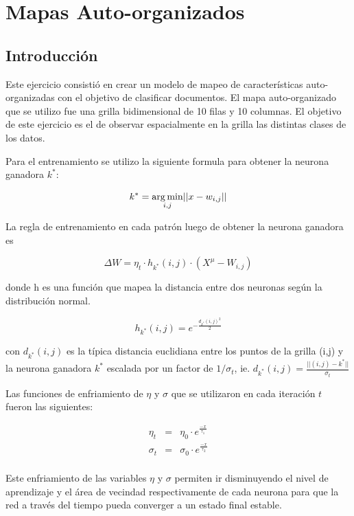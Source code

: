 \section{Mapas Auto-organizados }

\subsection{Introducción}
Este ejercicio consistió en crear un modelo de mapeo de características
auto-organizadas con el objetivo de clasificar documentos. El mapa
auto-organizado que se utilizo fue una grilla bidimensional de 10 filas y 10
columnas. El objetivo de este ejercicio es el de observar espacialmente en la
grilla las distintas clases de los datos.

Para el entrenamiento se utilizo la siguiente formula para obtener la neurona
ganadora $k^*$:

  \[
  k^* = \operatorname*{arg\,min}_{i,j} \lvert\lvert x-w_{i,j} \rvert\rvert
  \]

La regla de entrenamiento en cada patrón luego de obtener la neurona ganadora
es

\begin{equation}
	\Delta W = \eta_t \cdot h_{k^*}(i,j) \cdot (X^{\mu}-W_{i,j})
\end{equation}

donde h es una función que mapea la distancia entre dos neuronas según la
distribución normal.

\[
	h_{k^*}(i, j) = e^{-\frac{d_{k^*}(i,j)^2}{2}}
\]

con $d_{k^*}(i,j)$ es la típica distancia euclidiana entre los puntos de la
grilla (i,j) y la neurona ganadora $k^*$ escalada por un factor de
$1/\sigma_t$, ie.  $ d_{k^*}(i,j) = \frac{\lvert \lvert (i,j)-k^* \rvert
\rvert}{\sigma_t} $

Las funciones de enfriamiento de $\eta$ y $\sigma$ que se utilizaron en cada
iteración $t$ fueron las siguientes:

\[
  \begin{array}{ccc}
    \eta_t & = & \eta_0 \cdot e^{\frac{-x}{\tau_1}} \\
    \sigma_t & = & \sigma_0 \cdot e^{\frac{-x}{\tau_2}} \\
  \end{array}
\]

Este enfriamiento de las variables $\eta$ y $\sigma$ permiten ir disminuyendo
el nivel de aprendizaje y el área de vecindad respectivamente de cada neurona
para que la red a través del tiempo pueda converger a un estado final estable.

